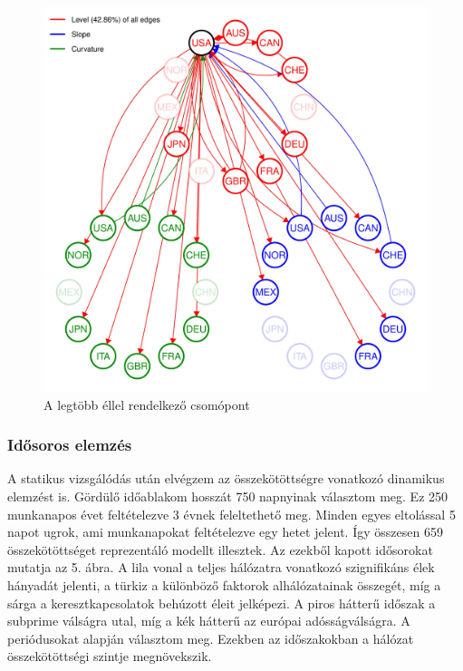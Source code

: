\documentclass[12pt,bibliography=totoc]{article}
\begin{document}

\begin{figure}[H]
\caption{A legtöbb éllel rendelkező csomópont}
\includegraphics[width=11.5cm]{USA_B_1_plot_2004-07-01_2019-12-31_0.01-page-001}
\centering
\end{figure}


\subsubsection{Idősoros elemzés}

A statikus vizsgálódás után elvégzem az összekötöttségre vonatkozó dinamikus elemzést is. Gördülő időablakom hosszát 750 napnyinak választom meg. Ez 250 munkanapos évet feltételezve 3 évnek feleltethető meg. Minden egyes eltolással 5 napot ugrok, ami munkanapokat feltételezve egy hetet jelent. Így összesen 659 összekötöttséget reprezentáló modellt illesztek. Az ezekből kapott idősorokat mutatja az 5. ábra. A lila vonal a teljes hálózatra vonatkozó szignifikáns élek hányadát jelenti, a türkiz a különböző faktorok alhálózatainak összegét, míg a sárga a keresztkapcsolatok behúzott éleit jelképezi. A piros hátterű időszak a subprime válságra utal, míg a kék hátterű az európai adósságválságra. A periódusokat \cite{bostanci2020connected} alapján választom meg. Ezekben az időszakokban a hálózat összekötöttségi szintje megnövekszik.
\end{document}
